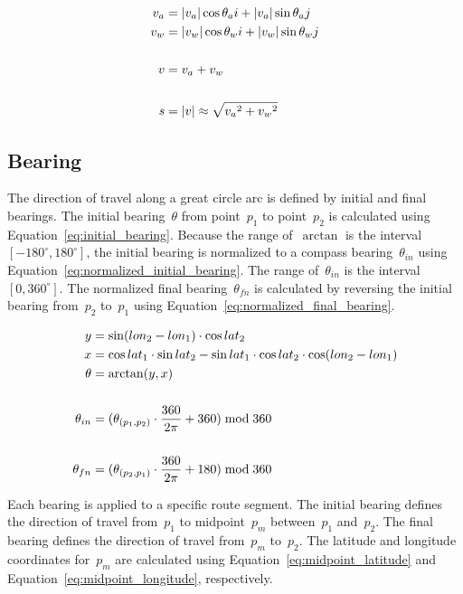 \begin{figure}[ht]
	\begin{align}
		\label{eq:UAV_velocity_vector_component_form}
			v_a & = |v_a| \cos \theta_ai + |v_a| \sin \theta_aj\\
		\label{eq:wind_velocity_vector_component_form}
			v_w & = |v_w| \cos \theta_wi + |v_w| \sin \theta_wj\\
			\nonumber\\
		\label{eq:velocity}
			v & = v_a + v_w\\
			\nonumber\\
		\label{eq:speed}
			s & = |v| \approx \sqrt{{v_a}^2 + {v_w}^2}
	\end{align}
\end{figure}

\subsection{Bearing}

The direction of travel along a great circle arc is defined by initial and final bearings. The initial bearing~$\theta$ from point~$p_1$ to point~$p_2$ is calculated using Equation~\ref{eq:initial_bearing}. Because the range of~$\arctan$ is the interval $[-180^\circ, 180^\circ]$, the initial bearing is normalized to a compass bearing~$\theta_{in}$ using Equation~\ref{eq:normalized_initial_bearing}. The range of~$\theta_{in}$ is the interval $[0, 360^\circ]$. The normalized final bearing~$\theta_{fn}$ is calculated by reversing the initial bearing from~$p_2$ to~$p_1$ using Equation~\ref{eq:normalized_final_bearing}.

\begin{figure}[ht]
	\begin{align}
		\label{eq:initial_bearing}
			\nonumber y & = \sin (lon_2 - lon_1) \cdot \cos lat_2\\
			\nonumber x & = \cos lat_1 \cdot \sin lat_2 - \sin lat_1 \cdot \cos lat_2 \cdot \cos (lon_2 - lon_1)\\
			\theta & = \arctan(y, x)\\
			\nonumber\\
		\label{eq:normalized_initial_bearing}
			\theta_{in} & = (\theta_{(p_1, p_2)} \cdot \frac{360}{2\pi} + 360) \bmod{360}\\
			\nonumber\\
		\label{eq:normalized_final_bearing}
			\theta_{fn} & = (\theta_{(p_2, p_1)} \cdot \frac{360}{2\pi} + 180) \bmod{360}
	\end{align}
\end{figure}

Each bearing is applied to a specific route segment. The initial bearing defines the direction of travel from~$p_1$ to midpoint~$p_m$ between~$p_1$ and~$p_2$. The final bearing defines the direction of travel from~$p_m$ to~$p_2$. The latitude and longitude coordinates for~$p_m$ are calculated using Equation~\ref{eq:midpoint_latitude} and Equation~\ref{eq:midpoint_longitude}, respectively.

